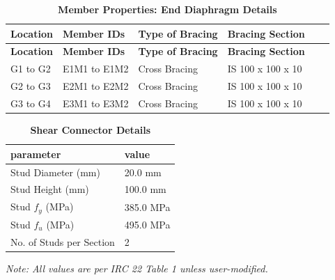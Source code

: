 \documentclass[12pt,a4paper]{report}
\numberwithin{table}{chapter}
\numberwithin{figure}{chapter}
\begin{document}
\vspace{0.4em}
\noindent
\setlength{\tabcolsep}{3pt}
\setlength\LTleft{0pt}
\setlength\LTright{\fill}

\begin{longtable}{|L{2.2cm}|L{2.2cm}|L{3.0cm}|L{2.5cm}|C{1.8cm}|C{1.8cm}|}
\caption{\textbf{Member Properties: End Diaphragm Details}}
\hline
\textbf{Location} & \textbf{Member IDs} & \textbf{Type of Bracing} & \textbf{Bracing Section} \\
\hline
\endfirsthead
\hline
\textbf{Location} & \textbf{Member IDs} & \textbf{Type of Bracing} & \textbf{Bracing Section} \\
\hline

\endhead
G1 to G2 & E1M1 to E1M2 & Cross Bracing & IS 100 x 100 x 10 \\[6pt]
\hline
G2 to G3 & E2M1 to E2M2 & Cross Bracing & IS 100 x 100 x 10 \\[6pt]
\hline
G3 to G4 & E3M1 to E3M2 & Cross Bracing & IS 100 x 100 x 10 \\[6pt]
\hline
\end{longtable}



\label{subsec:shear-connectors}

\vspace{2.2em}

\vspace{0.4em}
\begin{longtable}{|L{5.5cm}|p{10.0cm}|}
\caption{\textbf{Shear Connector Details}}
\hline
\textbf{parameter} & \textbf{value} \\
\hline
\textnormal{Stud Diameter (mm)} & 20.0 mm \\[6pt]
\hline
\textnormal{Stud Height (mm)} & 100.0 mm \\[6pt]
\hline
\textnormal{Stud $f_y$ (MPa)} & 385.0 MPa \\[6pt]
\hline
\textnormal{Stud $f_u$ (MPa)} & 495.0 MPa \\[6pt]
\hline
\textnormal{No. of Studs per Section} & 2 \\[6pt]
\hline
\end{longtable}



\label{subsec:safety-factors}

\vspace{2.2em}

\vspace{0.3em}
\noindent\textit{Note: All values are per IRC 22 Table 1 unless user-modified.}
\end{document}
